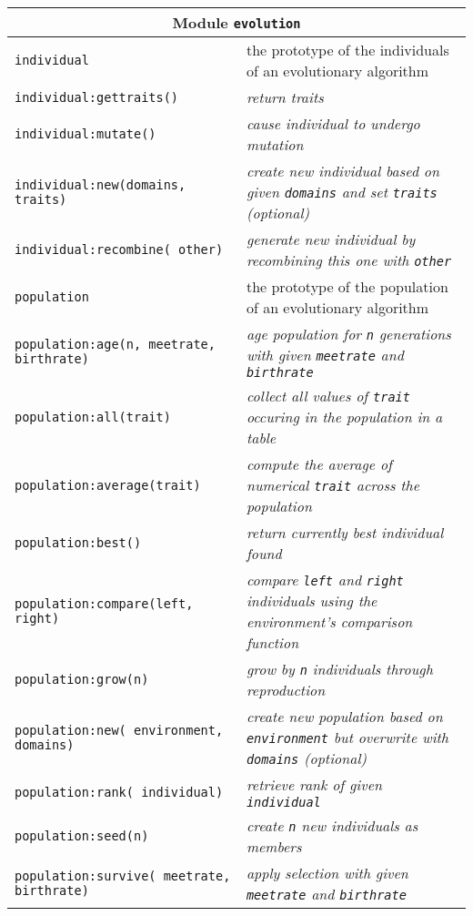 \begin{appendices}
\begin{table}[H]
\begin{tabular}{|p{5cm}|p{8cm}|}
\hline
\multicolumn{2}{|c|}{Module \texttt{evolution}}\\
\hline
\hline
\texttt{individual} & the prototype of the individuals of an evolutionary algorithm\\
\hline
\texttt{individual:gettraits()} & \emph{return traits}\\
\hline
\texttt{individual:mutate()} & \emph{cause individual to undergo mutation}\\
\hline
\texttt{individual:new(domains, traits)} & \emph{create new individual based on given \texttt{domains} and set \texttt{traits} (optional)}\\
\hline
\texttt{individual:recombine( other)} & \emph{generate new individual by recombining this one with \texttt{other}}\\
\hline
\texttt{population} & the prototype of the population of an evolutionary algorithm\\
\hline
\texttt{population:age(n, meetrate, birthrate)} & \emph{age population for \texttt{n} generations with given \texttt{meetrate} and \texttt{birthrate}}\\
\hline
\texttt{population:all(trait)} & \emph{collect all values of \texttt{trait} occuring in the population in a table}\\
\hline
\texttt{population:average(trait)} & \emph{compute the average of numerical \texttt{trait} across the population}\\
\hline
\texttt{population:best()} & \emph{return currently best individual found}\\
\hline
\texttt{population:compare(left, right)} & \emph{compare \texttt{left} and \texttt{right} individuals using the environment's comparison function}\\
\hline
\texttt{population:grow(n)} & \emph{grow by \texttt{n} individuals through reproduction}\\
\hline
\texttt{population:new( environment, domains)} & \emph{create new population based on \texttt{environment} but overwrite with \texttt{domains} (optional)}\\
\hline
\texttt{population:rank( individual)} & \emph{retrieve rank of given \texttt{individual}}\\
\hline
\texttt{population:seed(n)} & \emph{create \texttt{n} new individuals as members}\\
\hline
\texttt{population:survive( meetrate, birthrate)} & \emph{apply selection with given \texttt{meetrate} and \texttt{birthrate}} \\
\hline
\end{tabular}
\end{table}



\begin{comment}
\chapter{A quick guide to Lua's oddities}
\end{comment}

\end{appendices}